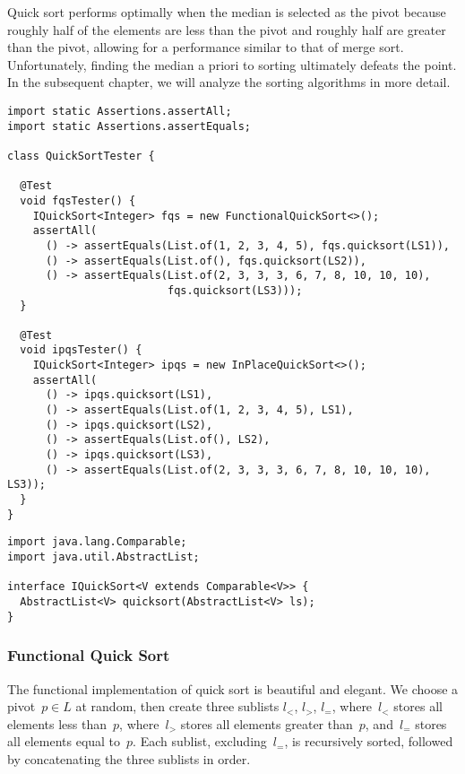 Quick sort performs optimally when the median is selected as the pivot because roughly half of the elements are less than the pivot and roughly half are greater than the pivot, allowing for a performance similar to that of merge sort. 
Unfortunately, finding the median a priori to sorting ultimately defeats the point. 
In the subsequent chapter, we will analyze the sorting algorithms in more detail.

\begin{lstlisting}[language=MyJava]
import static Assertions.assertAll;
import static Assertions.assertEquals;

class QuickSortTester {

  @Test
  void fqsTester() {
    IQuickSort<Integer> fqs = new FunctionalQuickSort<>();
    assertAll(
      () -> assertEquals(List.of(1, 2, 3, 4, 5), fqs.quicksort(LS1)),
      () -> assertEquals(List.of(), fqs.quicksort(LS2)),
      () -> assertEquals(List.of(2, 3, 3, 3, 6, 7, 8, 10, 10, 10), 
                         fqs.quicksort(LS3)));
  }

  @Test
  void ipqsTester() {
    IQuickSort<Integer> ipqs = new InPlaceQuickSort<>();
    assertAll(
      () -> ipqs.quicksort(LS1),
      () -> assertEquals(List.of(1, 2, 3, 4, 5), LS1),
      () -> ipqs.quicksort(LS2),
      () -> assertEquals(List.of(), LS2),
      () -> ipqs.quicksort(LS3),
      () -> assertEquals(List.of(2, 3, 3, 3, 6, 7, 8, 10, 10, 10), LS3));
  }
}
\end{lstlisting}

\begin{lstlisting}[language=MyJava]
import java.lang.Comparable;
import java.util.AbstractList;

interface IQuickSort<V extends Comparable<V>> {
  AbstractList<V> quicksort(AbstractList<V> ls);
}
\end{lstlisting}

\newpage
\subsubsection*{Functional Quick Sort}
The functional implementation of quick sort is beautiful and elegant. 
We choose a pivot~$p \in L$ at random, then create three sublists $l_<$, $l_>$, $l_=$, where~$l_<$ stores all elements less than~$p$, where~$l_>$ stores all elements greater than~$p$, and~$l_=$ stores all elements equal to~$p$. 
Each sublist, excluding~$l_=$, is recursively sorted, followed by concatenating the three sublists in order. 


